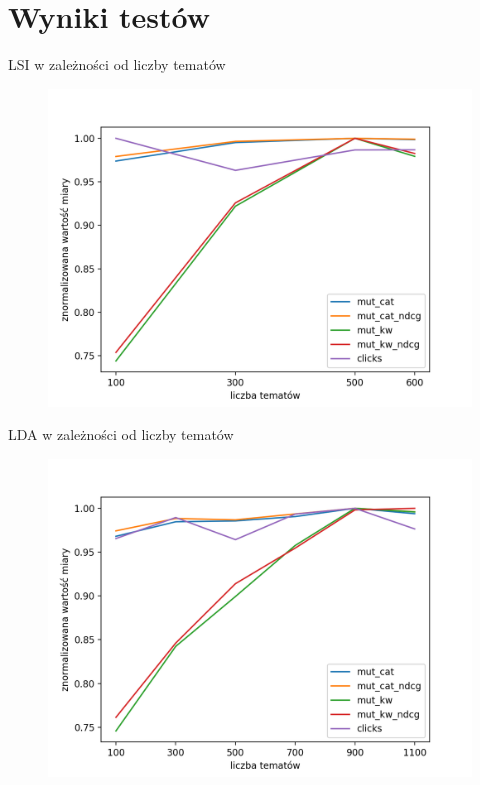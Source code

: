 \documentclass{beamer}
\begin{document}
	\section{Wyniki testów}
	\begin{frame}{LSI w zależności od liczby tematów}
		\begin{figure}[H]
			\centering
			\includegraphics[width=1\textwidth]{img/results/lsi_.png}
		\end{figure}
	\end{frame}
	\begin{frame}{LDA w zależności od liczby tematów}
		\begin{figure}[H]
			\centering
			\includegraphics[width=1\textwidth]{img/results/lda_.png}
		\end{figure}
	\end{frame}
\end{document}
